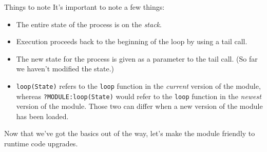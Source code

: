 \documentclass{beamer}
\begin{document}
\begin{frame}[fragile]{Things to note}
  It’s important to note a few things:

  \begin{itemize}
    \item The entire state of the process is on the \emph{stack}.

    \item Execution proceeds back to the beginning of the loop by using a tail
    call.

    \item The new state for the process is given as a parameter to the tail
    call.  (So far we haven’t modified the state.)

    \item \verb|loop(State)| refers to the \verb|loop| function in the
    \emph{current} version of the module, whereas \verb|?MODULE:loop(State)|
    would refer to the \verb|loop| function in the \emph{newest} version of the
    module. Those two can differ when a new version of the module has been
    loaded.
  \end{itemize}
\end{frame}

\begin{frame}[fragile]
  Now that we’ve got the basics out of the way, let’s make the module friendly
  to runtime code upgrades.
\end{frame}
\end{document}
